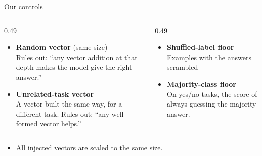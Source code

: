 \documentclass[aspectratio=169,11pt]{beamer}
\newcommand{\src}[1]{{\scriptsize\color{black!55} #1}}
\newcommand{\tight}{\setlength{\itemsep}{2pt plus 1pt minus 1pt}}
\begin{document}
\begin{frame}{Our controls}
  \vspace{2mm}
  \begin{columns}[T]
    \begin{column}{0.49\textwidth}
      \begin{itemize}\small\tight
        \item \textbf{Random vector} (same size)\\
              \src{Rules out: ``any vector addition at that depth makes the model
                give the right answer.''}
        \vspace{1.5mm}
        \item \textbf{Unrelated-task vector}\\
              \src{A vector built the same way, for a different task.
                Rules out: ``any well-formed vector helps.''}
      \end{itemize}
    \end{column}
    \begin{column}{0.49\textwidth}
      \begin{itemize}\small\tight
        \item \textbf{Shuffled-label floor}\\
              \src{Examples with the answers scrambled}
        \vspace{1.5mm}
        \item \textbf{Majority-class floor}\\
              \src{On yes/no tasks, the score of always guessing the
                majority answer.}
      \end{itemize}
    \end{column}
  \end{columns}
  \vspace{2mm}
  \begin{itemize}\small\tight
    \item All injected vectors are scaled to the same size.
  \end{itemize}
\end{frame}

\end{document}
